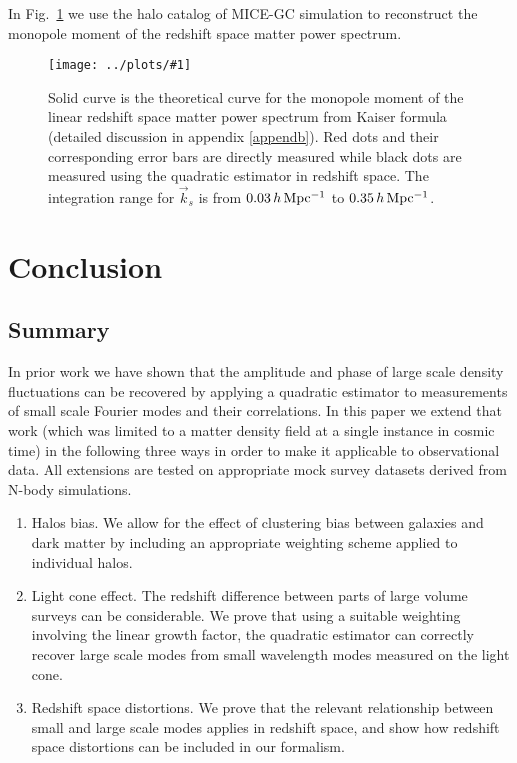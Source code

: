 \documentclass[prd,amsmath,amssymb,floatfix,superscriptaddress,nofootinbib,twocolumn]{revtex4-1}
\newcommand{\vk}{\vec{k}}
\newcommand{\rf}[1]{\ref{fig:#1}}
\newcommand{\sfig}[2]{
\texttt{[image: ../plots/\#1]}
        }
\newcommand{\Sfig}[2]{
   \begin{figure}[thbp]
   \begin{center}
    \sfig{../plots/#1.pdf}{\columnwidth}
    \caption{{\small #2}}
    \label{fig:#1}
     \end{center}
   \end{figure}
}
\begin{document}
In Fig.~\rf{SN_RS} we use the halo catalog of MICE-GC simulation to reconstruct the monopole moment of the redshift space matter power spectrum.

\Sfig{SN_RS}{Solid curve is the theoretical curve for the monopole moment of the linear redshift space matter power spectrum from Kaiser formula (detailed discussion in appendix \ref{appendb}). Red dots and their corresponding error bars are directly measured while black dots are measured using the quadratic estimator in redshift space. The integration range for $\vk_s$ is from $0.03 \,h \,\rm Mpc^{-1}$ to $0.35\,h\,\rm Mpc^{-1}$.}

\section{Conclusion} \label{sec8}
\subsection{Summary}
In prior work \cite{Li:2020fir} we have shown that the amplitude and phase of large scale density fluctuations can be recovered by applying a quadratic estimator to measurements of small scale Fourier  modes and their correlations. In this paper we extend that work (which was limited to a matter density field at a single instance in cosmic time) in the following three ways in order to make it applicable to observational data. All extensions are tested on appropriate mock survey datasets derived from N-body simulations.

\begin{enumerate}
\item  Halos bias. We allow for the effect of clustering bias between galaxies and dark matter by including an appropriate weighting scheme applied to individual halos.

\item Light cone effect. The redshift difference between parts of large volume surveys can be considerable. We prove that using a suitable weighting involving the linear growth factor, the quadratic estimator can correctly recover large scale modes from small wavelength modes measured on the light cone.

\item Redshift space distortions. We prove that the relevant relationship between small and large scale modes applies in redshift space, and show how redshift space distortions can be included in our formalism.
\end{enumerate}
 
\end{document}

